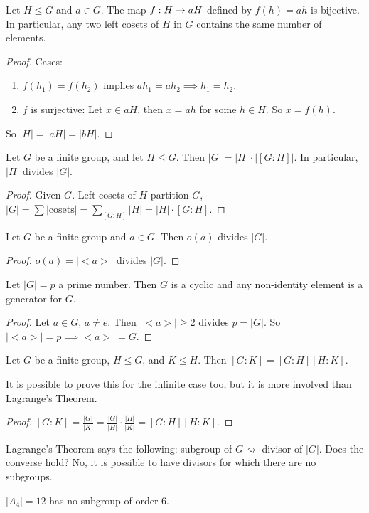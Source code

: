 \documentclass[]{article}
\begin{document}
\begin{proposition}
	Let $H\leq G$ and $a\in G$. The map $f: H\rightarrow aH$ defined by $f(h) = ah$ is bijective.
	In particular, any two left cosets of $H$ in $G$ contains the same number of elements.
\end{proposition}
\begin{proof}
	Cases:
	\begin{enumerate}
		\item 
		$f(h_1) = f(h_2)$ implies $ah_1 = ah_2\implies h_1 = h_2$.
		\item 
		$f$ is surjective: Let $x\in aH$, then $x = ah$ for some $h\in H$. So $x = f(h)$.
	\end{enumerate}
	So $|H| = |aH| = |bH|$.
\end{proof}
\begin{theorem}
	Let $G$ be a \ul{finite} group, and let $H\leq G$. Then $|G| = |H|\cdot|[G:H]|$.
	In particular, $|H|$ divides $|G|$.
\end{theorem}
\begin{proof}
	Given $G$.
	Left cosets of $H$ partition $G$, $|G| = \sum |\text{cosets}| = \sum_{[G:H]} |H| = |H|\cdot[G:H]$.
\end{proof}
\begin{corollary}
	Let $G$ be a finite group and $a\in G$. Then $o(a)$ divides $|G|$.
\end{corollary}
\begin{proof}
	$o(a) = |<a>|$ divides $|G|$.
\end{proof}
\begin{corollary}
	Let $|G| = p$ a prime number. Then $G$ is a cyclic and any non-identity element is a generator for $G$.
\end{corollary}
\begin{proof}
	Let $a\in G$, $a\neq e$. Then $|<a>|\geq 2$ divides $p = |G|$. So $|<a>| = p \implies <a>\ = G$.
\end{proof}
\begin{proposition}
	Let $G$ be a finite group, $H\leq G$, and $K\leq H$. Then $[G:K]=[G:H][H:K]$.
\end{proposition}
\begin{remark}
	It is possible to prove this for the infinite case too, but it is more involved than Lagrange's Theorem.
\end{remark}
\begin{proof}
	$[G:K] = \frac{|G|}{|K|} = \frac{|G|}{|H|}\cdot\frac{|H|}{|K|} = [G:H][H:K]$.
\end{proof}
\begin{remark}
	Lagrange's Theorem says the following: subgroup of $G \rightsquigarrow$ divisor of $|G|$. Does the converse hold? No, it is possible to have divisors for which there are no subgroups.
\end{remark}
\begin{example}
	$|A_4| = 12$ has no subgroup of order 6.
\end{example}
\end{document}
